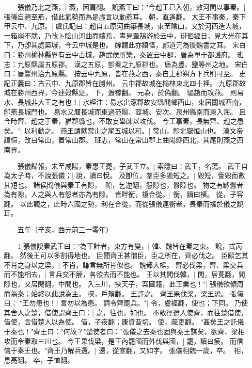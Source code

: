 　　張儀乃北之燕，|{
	燕，因肩翻。
}
說燕王曰："今趙王已入朝，效河間以事秦。|{
	張儀自趙至燕，借此氣勢而為是虛言以動燕耳。
	朝，直遙翻。
}
大王不事秦，秦下甲云中、九原。|{
	虞氏記曰：趙自五原河曲築長城，東至陰山，又於河西造大城，一箱崩不就，乃改卜陰山河曲而禱焉，晝見羣鵠游於云中，徘徊經日，見大光在其下，乃卽其處築城，今云中城是也。
	餘謂此亦語怪，酈道元為後魏書之耳。
	宋白曰：勝州榆林縣界有云中古城，趙武侯所築，秦置云中郡，唐為單于都護府。
	班志：九原縣屬五原郡。
	漢之五原，卽秦之九原郡也。
	唐為豐、鹽等州之地。
	宋白曰：唐豐州治九原縣。
	按云中九原，皆在燕之西，秦自上郡朔方下兵則可至。
	史記正義曰：古云中、九原郡皆在勝州。
	云中郡故城在榆林東北四十裡。
	九原郡故城在勝州西界，今連穀縣是。
	下，遐稼翻。
	元為，於偽翻。
}
驅趙而攻燕。
	則易水、長城非大王之有也！|{
	水經注：易水出涿郡故安縣閻鄉西山，東屆關城西南，卽燕長城門也。
	易水又曆長城而東過范陽、容城、安次、泉州縣南而東入海。
}
且今時齊、趙之于秦，猶郡縣也，不敢妄舉師以攻伐。
	今王事秦，長無齊、趙之患矣。"|{
	以利動之。
}
燕王請獻常山之尾五城以和。|{
	常山，卽北嶽恒山也。
	漢文帝諱恒，改曰常山，置常山郡。
	班志，常山在常山郡上曲陽縣西北，其尾則燕之西南界。
}

　　張儀歸報，未至咸陽，秦惠王薨，子武王立。|{
	索隱曰：武王，名蕩。
}
武王自為太子時，不說張儀；|{
	說，讀曰悅。
}
及卽位，羣臣多毀短之。|{
	毀短，訾毀而數其短也。
}
諸侯聞儀與秦王有隙，|{
	隙，乞逆翻，怨隙也，釁隙也。
	物之有罅釁者為有隙，人之與人有怨者亦為有隙。
}
皆畔衡，複合從。|{
	衡，讀曰橫。
	從，子容翻。
	以此觀之，此時六國之勢，利在合從，而從張儀連衡者，畏秦而搖於儀之說耳。
}

　　五年（辛亥，西元前三一零年）

　　1 張儀說秦武王曰："為王計者，東方有變，|{
	韓、魏皆在秦之東。
	說，式芮翻。
}
然後王可以多割得地也。
	臣聞齊王甚憎臣，臣之所在，齊必伐之。
	臣願乞其不肖之身以之梁，|{
	不肖，謙言無所肖似也。
	魏都大樑。
}
齊必伐梁，齊、梁交兵而不能相去，|{
	言兵交不解，各欲去而不能也。
}
王以其間伐韓，|{
	間，居莧翻，間隙也，又居閑翻，中間也。
}
入三川，挾天子，案圖籍，此王業也！"|{
	張儀欲傾周而為秦；始終以此說為主。
	挾，戶頰翻。
}
王許之。
	齊王果伐梁，梁王恐。
	張儀曰： "王勿患也！|{
	言勿以為患。
}
請令齊罷兵。"|{
	令，盧經翻，使也；下同。
}
乃使其舍人之楚，借使謂齊王曰：|{
	之，往也，如也。
	不敢徑遣人使齊，而往楚借使，借使，言借楚人以為使。
	借，子夜翻；康資昔切。
	使，疏吏翻。
}
"甚矣王之託儀于秦也！"齊王曰："何故？"楚使者曰："張儀之去秦也固與秦王謀矣，欲齊、梁相攻而令秦取三川也。
	今王果伐梁，是王內罷國而外伐與國，|{
	罷，讀曰疲。
}
而信儀于秦王也。"齊王乃解兵還。|{
	還，從宣翻，又如字。
}
張儀相魏一歲，卒。|{
	相，息亮翻。
	卒，子恤翻。
}

